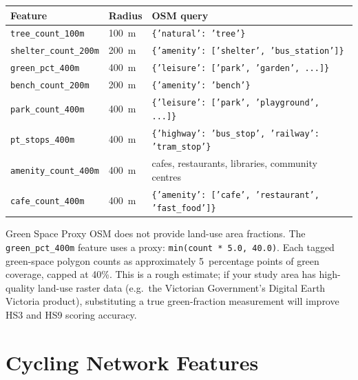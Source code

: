 \documentclass[11pt,a4paper,openany]{book}
\begin{document}
\begin{center}
\begin{tabular}{L{4.2cm} C{1.8cm} L{7cm}}
\toprule
\textbf{Feature} & \textbf{Radius} & \textbf{OSM query} \\
\midrule
\texttt{tree\_count\_100m}     & 100~m & \texttt{\{'natural': 'tree'\}} \\
\texttt{shelter\_count\_200m}  & 200~m & \texttt{\{'amenity': ['shelter', 'bus\_station']\}} \\
\texttt{green\_pct\_400m}      & 400~m & \texttt{\{'leisure': ['park', 'garden', ...]\}} \\
\texttt{bench\_count\_200m}    & 200~m & \texttt{\{'amenity': 'bench'\}} \\
\texttt{park\_count\_400m}     & 400~m & \texttt{\{'leisure': ['park', 'playground', ...]\}} \\
\texttt{pt\_stops\_400m}       & 400~m & \texttt{\{'highway': 'bus\_stop', 'railway': 'tram\_stop'\}} \\
\texttt{amenity\_count\_400m}  & 400~m & cafes, restaurants, libraries, community centres \\
\texttt{cafe\_count\_400m}     & 400~m & \texttt{\{'amenity': ['cafe', 'restaurant', 'fast\_food']\}} \\
\bottomrule
\end{tabular}
\end{center}

\begin{tipbox}{Green Space Proxy}
OSM does not provide land-use area fractions. The \texttt{green\_pct\_400m} feature uses a proxy: \texttt{min(count * 5.0, 40.0)}. Each tagged green-space polygon counts as approximately 5~percentage points of green coverage, capped at 40\%. This is a rough estimate; if your study area has high-quality land-use raster data (e.g.\ the Victorian Government's Digital Earth Victoria product), substituting a true green-fraction measurement will improve HS3 and HS9 scoring accuracy.
\end{tipbox}

\section{Cycling Network Features}
\end{document}
